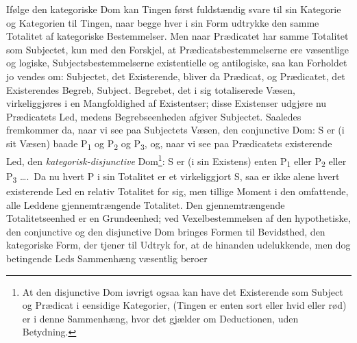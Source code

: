 \documentclass[12pt]{book}
\newcommand{\opage}[1]{\marginnote{\footnotesize\textit{[#1]}}}
\begin{document}
Ifølge den kategoriske Dom kan Tingen først fuldstændig
svare til sin Kategorie og Kategorien til Tingen, naar begge
hver i sin Form udtrykke den samme Totalitet af kategoriske
Bestemmelser. Men naar Prædicatet har samme Totalitet
som Subjectet, kun med den Forskjel, at Prædicatsbestemmelserne
ere væsentlige og logiske, Subjectsbestemmelserne existentielle og
antilogiske, saa kan Forholdet jo vendes om: Subjectet, det
Existerende, bliver da Prædicat, og Prædicatet, det Existerendes
Begreb, Subject. Begrebet, det i sig totaliserede Væsen,
virkeliggjøres i en Mangfoldighed af Existentser; disse Existenser
udgjøre nu Prædicatets Led, medens Begrebseenheden
afgiver Subjectet. Saaledes fremkommer da, naar vi see paa
Subjectets Væsen, den conjunctive Dom: S er (i sit Væsen)
baade P\textsubscript{1} og P\textsubscript{2} og P\textsubscript{3}, og, naar vi see paa Prædicatets existerende
Led, den \emph{kategorisk-disjunctive} Dom\footnote{%
At den disjunctive Dom iøvrigt ogsaa kan have det Existerende
som Subject og Prædicat i eensidige Kategorier, (Tingen er enten
sort eller hvid eller rød) er i denne Sammenhæng, hvor det gjælder
om Deductionen, uden Betydning.}: S er
\opage{65}(i sin Existens) enten P\textsubscript{1} eller P\textsubscript{2} eller P\textsubscript{3} \dots.\ Da nu hvert
P i sin Totalitet er et virkeliggjort S, saa er ikke alene hvert
existerende Led en relativ Totalitet for sig, men tillige Moment
i den omfattende, alle Leddene gjennemtrængende Totalitet.
Den gjennemtrængende Totalitetseenhed er en Grundeenhed;
ved Vexelbestemmelsen af den hypothetiske, den conjunctive og
den disjunctive Dom bringes Formen til Bevidsthed, den
kategoriske Form, der tjener til Udtryk for, at de hinanden udelukkende,
men dog betingende Leds Sammenhæng væsentlig beroer
\end{document}

